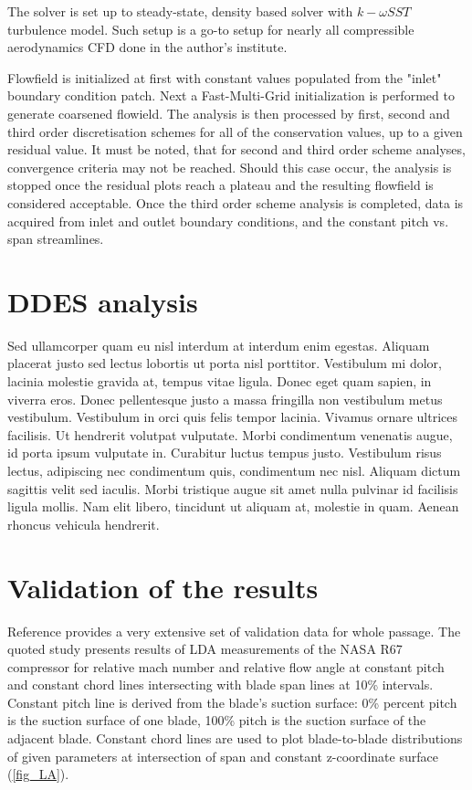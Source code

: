The solver is set up to steady-state, density based solver with $k-\omega SST$ turbulence model. Such setup is a go-to setup for nearly all compressible aerodynamics CFD done in the author's institute.

Flowfield is initialized at first with constant values populated from the "inlet" boundary condition patch. Next a Fast-Multi-Grid initialization is performed to generate coarsened flowield. The analysis is then processed by first, second and third order discretisation schemes for all of the conservation values, up to a given residual value. It must be noted, that for second and third order scheme analyses, convergence criteria may not be reached. Should this case occur, the analysis is stopped once the residual plots reach a plateau and the resulting flowfield is considered acceptable. Once the third order scheme analysis is completed, data is acquired from inlet and outlet boundary conditions, and the constant pitch vs. span streamlines.

\section{DDES analysis}
Sed ullamcorper quam eu nisl interdum at interdum enim egestas. Aliquam placerat justo sed lectus lobortis ut porta nisl porttitor. Vestibulum mi dolor, lacinia molestie gravida at, tempus vitae ligula. Donec eget quam sapien, in viverra eros. Donec pellentesque justo a massa fringilla non vestibulum metus vestibulum. Vestibulum in orci quis felis tempor lacinia. Vivamus ornare ultrices facilisis. Ut hendrerit volutpat vulputate. Morbi condimentum venenatis augue, id porta ipsum vulputate in. Curabitur luctus tempus justo. Vestibulum risus lectus, adipiscing nec condimentum quis, condimentum nec nisl. Aliquam dictum sagittis velit sed iaculis. Morbi tristique augue sit amet nulla pulvinar id facilisis ligula mollis. Nam elit libero, tincidunt ut aliquam at, molestie in quam. Aenean rhoncus vehicula hendrerit.

\section{Validation of the results}
Reference \citep{r67laser} provides a very extensive set of validation data for whole passage. The quoted study presents results of LDA measurements of the NASA R67 compressor for relative mach number and relative flow angle at constant pitch and constant chord lines intersecting with blade span lines at 10\% intervals. Constant pitch line is derived from the blade's suction surface: 0\% percent pitch is the suction surface of one blade, 100\% pitch is the suction surface of the adjacent blade. Constant chord lines are used to plot blade-to-blade distributions of given parameters at intersection of span and constant z-coordinate surface (\ref{fig_LA}).

